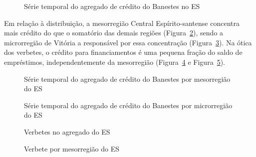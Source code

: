 \documentclass[
  12pt,
  twoside,
  openright,
  a4paper,
  chapter=TITLE,
  section=TITLE,
  brazil]{abntex2}
\begin{document}
\begin{figure}


\caption{\label{fig-agregado}Série temporal do agregado de crédito do
Banestes no ES}

\end{figure}%

Em relação à distribuição, a mesorregião Central Espírito-santense
concentra mais crédito do que o somatório das demais regiões
(Figura~\ref{fig-meso}), sendo a microrregião de Vitória a responsável
por essa concentração (Figura~\ref{fig-micro}). Na ótica dos verbetes, o
crédito para financiamentos é uma pequena fração do saldo de
empréstimos, independentemente da mesorregião (Figura~\ref{fig-verbetes}
e Figura~\ref{fig-verbete-meso}).

\begin{figure}


\caption{\label{fig-meso}Série temporal do agregado de crédito do
Banestes por mesorregião do ES}

\end{figure}%

\begin{figure}


\caption{\label{fig-micro}Série temporal do agregado de crédito do
Banestes por microrregião do ES}

\end{figure}%

\begin{figure}


\caption{\label{fig-verbetes}Verbetes no agregado do ES}

\end{figure}%

\begin{figure}


\caption{\label{fig-verbete-meso}Verbete por mesorregião do ES}

\end{figure}%
\end{document}
